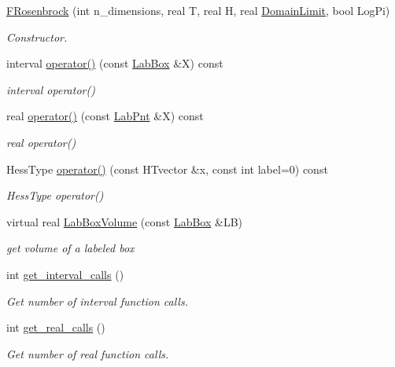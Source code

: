 \begin{DoxyCompactItemize}
\item 
\hyperlink{classFRosenbrock_a98f8543097e580a8013c04fe2451ba80}{\-F\-Rosenbrock} (int n\-\_\-dimensions, real \-T, real \-H, real \hyperlink{LevyFobj2D_8cpp_ae28a2599911ae746bc33211d3ea52aaf}{\-Domain\-Limit}, bool \-Log\-Pi)
\begin{DoxyCompactList}\small\item\em \-Constructor. \end{DoxyCompactList}\item 
interval \hyperlink{classFRosenbrock_a31adc48845c9b35628d57497cff8666c}{operator()} (const \hyperlink{classLabBox}{\-Lab\-Box} \&\-X) const 
\begin{DoxyCompactList}\small\item\em interval operator() \end{DoxyCompactList}\item 
real \hyperlink{classFRosenbrock_aa626842acb0907225aa493f048996535}{operator()} (const \hyperlink{classLabPnt}{\-Lab\-Pnt} \&\-X) const 
\begin{DoxyCompactList}\small\item\em real operator() \end{DoxyCompactList}\item 
\-Hess\-Type \hyperlink{classFRosenbrock_a47652c3d90874911897f9601f7003e8f}{operator()} (const \-H\-Tvector \&x, const int label=0) const 
\begin{DoxyCompactList}\small\item\em \-Hess\-Type operator() \end{DoxyCompactList}\item 
virtual real \hyperlink{classFRosenbrock_ac6cdd39b087bbb77561eb8dd0e427ce9}{\-Lab\-Box\-Volume} (const \hyperlink{classLabBox}{\-Lab\-Box} \&\-L\-B)
\begin{DoxyCompactList}\small\item\em get volume of a labeled box \end{DoxyCompactList}\item 
int \hyperlink{classFRosenbrock_a6ca09c94fc6597d64474a87af8ffc59d}{get\-\_\-interval\-\_\-calls} ()
\begin{DoxyCompactList}\small\item\em \-Get number of interval function calls. \end{DoxyCompactList}\item 
int \hyperlink{classFRosenbrock_ab1f708734168295d5120388e9a25d767}{get\-\_\-real\-\_\-calls} ()
\begin{DoxyCompactList}\small\item\em \-Get number of real function calls. \end{DoxyCompactList}\end{DoxyCompactItemize}
